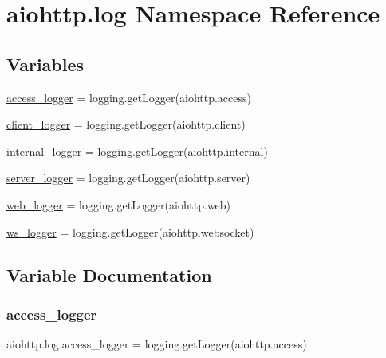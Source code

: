\hypertarget{namespaceaiohttp_1_1log}{}\section{aiohttp.\+log Namespace Reference}
\label{namespaceaiohttp_1_1log}
\subsection*{Variables}
\begin{DoxyCompactItemize}
\item 
\hyperlink{namespaceaiohttp_1_1log_a69f9a3ed3aba3608f1ea060f5b20db0f}{access\+\_\+logger} = logging.\+get\+Logger(\textquotesingle{}aiohttp.\+access\textquotesingle{})
\item 
\hyperlink{namespaceaiohttp_1_1log_a747ecf593dc0e306023bff304fe1afa3}{client\+\_\+logger} = logging.\+get\+Logger(\textquotesingle{}aiohttp.\+client\textquotesingle{})
\item 
\hyperlink{namespaceaiohttp_1_1log_af3cfc03ec0a745606e9eeca03960a2c1}{internal\+\_\+logger} = logging.\+get\+Logger(\textquotesingle{}aiohttp.\+internal\textquotesingle{})
\item 
\hyperlink{namespaceaiohttp_1_1log_a3011e9e1ea3d0acaa2d6c64d236f4516}{server\+\_\+logger} = logging.\+get\+Logger(\textquotesingle{}aiohttp.\+server\textquotesingle{})
\item 
\hyperlink{namespaceaiohttp_1_1log_ae11371c1873210ed0a4ce9dd07762e33}{web\+\_\+logger} = logging.\+get\+Logger(\textquotesingle{}aiohttp.\+web\textquotesingle{})
\item 
\hyperlink{namespaceaiohttp_1_1log_a34d6fedb003a32d6519601b7ab92f297}{ws\+\_\+logger} = logging.\+get\+Logger(\textquotesingle{}aiohttp.\+websocket\textquotesingle{})
\end{DoxyCompactItemize}


\subsection{Variable Documentation}
\mbox{\label{namespaceaiohttp_1_1log_a69f9a3ed3aba3608f1ea060f5b20db0f}} 
\subsubsection{\texorpdfstring{access\+\_\+logger}{access\_logger}}
{\footnotesize\ttfamily aiohttp.\+log.\+access\+\_\+logger = logging.\+get\+Logger(\textquotesingle{}aiohttp.\+access\textquotesingle{})}

